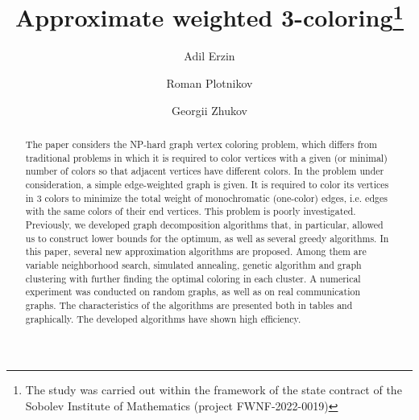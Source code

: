 \documentclass[runningheads]{llncs}
\begin{document}
\title{Approximate weighted 3-coloring\thanks{The study was carried out within the framework of the state contract of the Sobolev Institute of Mathematics (project FWNF-2022-0019)}}
%
\author{Adil Erzin \and Roman Plotnikov \and Georgii Zhukov}
%
%

%
\maketitle              %
%
\begin{abstract}
The paper considers the NP-hard graph vertex coloring problem, which differs from traditional problems in which it is required to color vertices with a given (or minimal) number of colors so that adjacent vertices have different colors. In the problem under consideration, a simple edge-weighted graph is given. It is required to color its vertices in 3 colors to minimize the total weight of monochromatic (one-color) edges, i.e. edges with the same colors of their end vertices. This problem is poorly investigated. Previously, we developed graph decomposition algorithms that, in particular, allowed us to construct lower bounds for the optimum, as well as several greedy algorithms. In this paper, several new approximation algorithms are proposed. Among them are variable neighborhood search, simulated annealing, genetic algorithm and graph clustering with further finding the optimal coloring in each cluster. A numerical experiment was conducted on random graphs, as well as on real communication graphs. The characteristics of the algorithms are presented both in tables and graphically. The developed algorithms have shown high efficiency.


\end{abstract}
\end{document}
